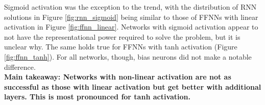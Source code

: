 \documentclass[12pt]{article}
\begin{document}
Sigmoid activation was the exception to the trend, with the distribution of RNN solutions in Figure \ref{fig:rnn_sigmoid} being similar to those of FFNNs with linear activation in Figure \ref{fig:ffnn_linear}. Networks with sigmoid activation appear to not have the representational power required to solve the problem, but it is unclear why. The same holds true for FFNNs with tanh activation (Figure \ref{fig:ffnn_tanh}). For all networks, though, bias neurons did not make a notable difference.\\

\textbf{Main takeaway: Networks with non-linear activation are not as successful as those with linear activation but get better with additional layers. This is most pronounced for tanh activation. }


\begin{figure}[!tbp]
  \centering
  \hfill
  \hfill
  

\end{figure}
\end{document}
